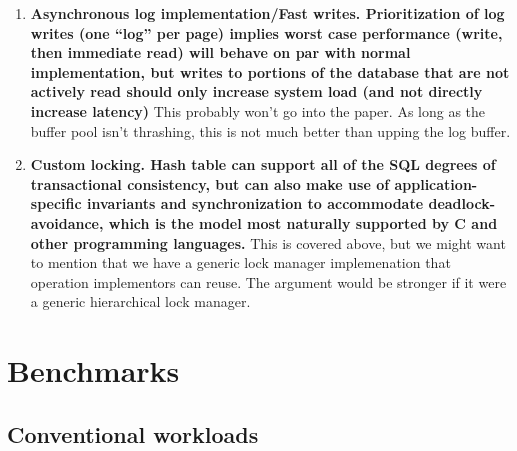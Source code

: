 \documentclass[letterpaper,twocolumn,english]{article}
\newcommand{\yad}{Lemon\xspace}
\begin{document}
\begin{enumerate}
However, because of the way we chose $h_{n+1}(x),$ we know that the
contents of each bucket, $m$, will be split between bucket $m$ and
bucket $m+2^{n}$. Therefore, if we keep track of the last bucket that
was split, we can split a few buckets at a time, resizing the hash
table without introducing long pauses while we reorganize the hash
table~\cite{lht}. We can handle overflow using standard techniques;
\yad's linear hash table simply uses the linked list implementations
described above.  The bucket list is implemented by reusing the array
list implementation described above.


  \item {\bf Asynchronous log implementation/Fast
  writes. Prioritization of log writes (one {}``log'' per page)
  implies worst case performance (write, then immediate read) will
  behave on par with normal implementation, but writes to portions of
  the database that are not actively read should only increase system
  load (and not directly increase latency)} This probably won't go
  into the paper.  As long as the buffer pool isn't thrashing, this is
  not much better than upping the log buffer.

  \item {\bf Custom locking. Hash table can support all of the SQL
  degrees of transactional consistency, but can also make use of
  application-specific invariants and synchronization to accommodate
  deadlock-avoidance, which is the model most naturally supported by C
  and other programming languages.}  This is covered above, but we
  might want to mention that we have a generic lock manager
  implemenation that operation implementors can reuse.  The argument
  would be stronger if it were a generic hierarchical lock manager.


\end{enumerate}

\section{Benchmarks}

\subsection{Conventional workloads}
\end{document}
